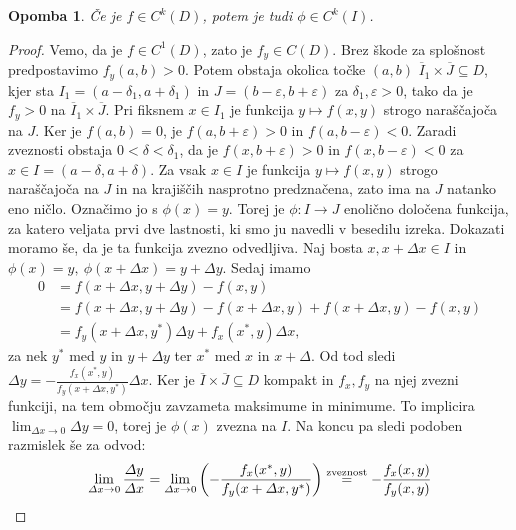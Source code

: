 \documentclass[10pt, a4paper]{article}
\newtheorem*{opomba}{Opomba}
\newenvironment{noticeC}{%
  \tcolorbox[%
  notitle,
  empty,
  enhanced,  %
  breakable,
  coltext=black, 
  fontupper=\rmfamily,
  parbox=false,
  noparskip,
  sharp corners,
  boxrule=-1pt,  %
  frame hidden,
  left=7pt,  %
  right=7pt,
  top=5pt,
  bottom=5pt,
  before skip=2.5ex plus 2pt,
  after skip=2.5ex plus 2pt,
  overlay unbroken and last={%
  },
  ]}
{\endtcolorbox}
\newenvironment{dokaz}%
  {\begin{noticeC}\begin{proof}}%
  {\end{proof}\end{noticeC}}
\begin{document}
\begin{opomba}
    Če je $f \in C^k (D)$, potem je tudi $\phi \in C^k (I)$.
\end{opomba}

\begin{dokaz}
    Vemo, da je $f \in C^1 (D)$, zato je $f_y \in C(D)$.
    Brez škode za splošnost predpostavimo $f_y (a, b) > 0$.
    Potem obstaja okolica točke $(a, b)$ $\overline{I}_1 \times \overline{J} \subseteq D$,
    kjer sta $I_1 = (a - \delta_1, a + \delta_1)$ in $J = (b - \varepsilon, b + \varepsilon)$ za 
    $\delta_1, \varepsilon > 0$, tako da je $f_y > 0$ na $\overline{I}_1 \times \overline{J}$.
    Pri fiksnem $x \in I_1$ je funkcija $y \mapsto f(x, y)$ strogo naraščajoča na $J$.
    Ker je $f(a, b) = 0$, je $f(a, b + \varepsilon) > 0$ in $f(a, b - \varepsilon) < 0$.
    Zaradi zveznosti obstaja $0 < \delta < \delta_1$, da je $f(x, b + \varepsilon) > 0$ in $f(x, b - \varepsilon) < 0$
    za $x \in I = (a - \delta, a + \delta)$.
    Za vsak $x \in I$ je funkcija $y \mapsto f(x, y)$ strogo naraščajoča na $J$ in na 
    krajiščih nasprotno predznačena, zato ima na $J$ natanko eno ničlo.
    Označimo jo s $\phi (x) = y$.
    Torej je $\phi: I \rightarrow J$ enolično določena funkcija, za katero veljata prvi dve lastnosti, ki smo ju navedli v besedilu izreka.
    Dokazati moramo še, da je ta funkcija zvezno odvedljiva.
    Naj bosta $x, x + \varDelta x \in I$ in $\phi(x) = y,\ \phi(x + \varDelta x) = y + \varDelta y$.
    Sedaj imamo 
    \begin{align*}
        0 &= f(x + \varDelta x, y + \varDelta y) - f(x, y)\\
        &= f(x + \varDelta x, y + \varDelta y) - f(x + \varDelta x, y) + f(x + \varDelta x, y) - f(x, y)\\
        &= f_y (x + \varDelta x, y^*) \varDelta y + f_x (x^*, y) \varDelta x,
    \end{align*}
    za nek $y^*$ med $y$ in $y + \varDelta y$ ter $x^*$ med $x$ in $x + \varDelta$.
    Od tod sledi $\varDelta y = - \frac{f_x (x^*, y)}{f_y (x + \varDelta x, y^*)} \varDelta x$.
    Ker je $\overline{I} \times \overline{J} \subseteq D$ kompakt in $f_x, f_y$ na njej zvezni funkciji,
    na tem območju zavzameta maksimume in minimume. To implicira $\lim_{\varDelta x \to 0} \varDelta y = 0$,
    torej je $\phi(x)$ zvezna na $I$. Na koncu pa sledi podoben razmislek še za odvod:
    \begin{equation*}
        \lim_{\varDelta x \to 0} \frac{\varDelta y}{\varDelta x} 
        = \lim_{\varDelta x \to 0} \left( -\frac{f_x (x^*, y)}{f_y (x + \varDelta x, y^*)} \right)
        \stackrel{\text{zveznost}}{=} - \frac{f_x (x, y)}{f_y (x, y)} \qedhere
    \end{equation*}
\end{dokaz}
\end{document}
